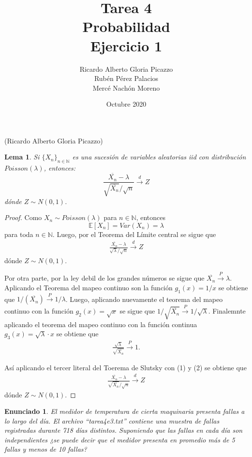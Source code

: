 \documentclass[letterpaper, 12pt]{article}
\title{Tarea 4\\Probabilidad\\Ejercicio 1}
\author{
    Ricardo Alberto Gloria Picazzo\\
    Rubén Pérez Palacios\\
    Mercé Nachón Moreno
}
\date{Octubre 2020}
\newcommand{\E}{\mathbb{E}}
\newcommand{\N}{\mathbb{N}}
\newtheorem{lemma}{Lema}
\newtheorem{enunciado}{Enunciado}
\begin{document}
\maketitle

(Ricardo Alberto Gloria Picazzo)
\begin{lemma}
    Si $\{X_n\}_{n\in \N}$ es una sucesión de variables aleatorias iid con distribución $Poisson(\lambda)$, entonces:
    \[
        \frac{\overline{X_n}-\lambda}{\sqrt{\overline{X_n}}/\sqrt{n}} \overset{d}{\to} Z
        \]
    dónde $Z\sim N(0, 1)$.
\end{lemma}
\begin{proof}
    Como $X_n \sim  Poisson(\lambda)$ para $n\in \N$, entonces 
    \[
        \E[X_n] = Var(X_n) = \lambda
        \] 
    para toda $n\in \N$. Luego, por el Teorema del Límite central se sigue que 
    \begin{align}
        \frac{\overline{X_n}-\lambda}{\sqrt{\lambda}/\sqrt{n}} \overset{d}{\to} Z
    \end{align}
    dónde $Z\sim N(0, 1)$.

    Por otra parte, por la ley debil de los grandes números se sigue que $\overline{X_n}  \overset{P}{\to} \lambda$. Aplicando el Teorema del mapeo continuo son la función $g_1(x) = 1/x$ se obtiene que $1/(\overline{X_n})  \overset{P}{\to} 1/\lambda$. Luego, aplicando nuevamente el teorema del mapeo continuo con la función $g_2(x)=\sqrt{x}$ se sigue que  $1/\sqrt{\overline{X_n}}  \overset{P}{\to} 1/\sqrt{\lambda}$. Finalemnte aplicando el teorema del mapeo continuo con la función continua $g_3(x)=\sqrt{\lambda}\cdot x$ se obtiene que 
    \begin{align}
        \frac{\sqrt{\lambda}}{\sqrt{\overline{X_n}}} \overset{P}{\to} 1.
    \end{align}

    Así aplicando el tercer literal del Toerema de Slutsky con (1) y (2) se obtiene que 
    \begin{align*}
        \frac{\overline{X_n}-\lambda}{\sqrt{\overline{X_n}}/\sqrt{n}} \overset{d}{\to} Z
    \end{align*}
    dónde $Z\sim N(0, 1)$.
\end{proof}



\begin{enunciado}
    El medidor de temperatura de cierta maquinaria presenta fallas a lo largo del día. El archivo ``tarea4e3.txt'' contiene una muestra de fallas registradas durante 718 días distintos. Suponiendo que las fallas en cada día son independientes ¿se puede decir que el medidor presenta en promedio más de 5 fallas y menos de 10 fallas?
\end{enunciado}
\end{document}
